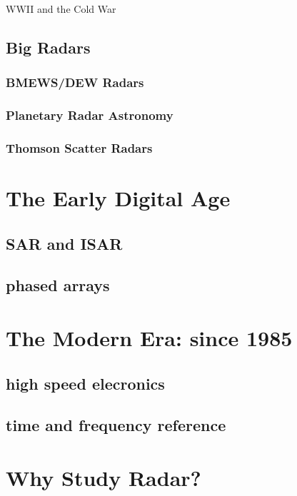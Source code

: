 WWII and the Cold War

\subsection{Big Radars}

\subsubsection{BMEWS/DEW Radars}

\subsubsection{Planetary Radar Astronomy}

\subsubsection{Thomson Scatter Radars}

\section{The Early Digital Age}

\subsection{SAR and ISAR}

\subsection{phased arrays}

\section{The Modern Era: since 1985}

\subsection{high speed elecronics}

\subsection{time and frequency reference}

\section{Why Study Radar?}

